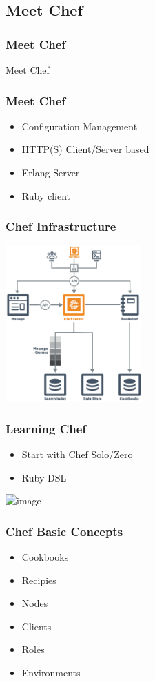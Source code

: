 \subsection{Meet Chef}

\frame
{
  \frametitle{Meet Chef}

  \begin{center}
    \Huge Meet Chef
  \end{center}
}

\frame
{
  \frametitle{Meet Chef}

  \begin{itemize}
  \item<1-> Configuration Management
  \item<2-> HTTP(S) Client/Server based
  \item<3-> Erlang Server
  \item<4-> Ruby client
  \end{itemize}
}

\frame
{
  \frametitle{Chef Infrastructure}
  \begin{center}%
    \includegraphics[height=6cm]{images/server_components.pdf}
  \end{center}%
}

\frame
{
  \frametitle{Learning Chef}

  \begin{itemize}
  \item<1-> Start with Chef Solo/Zero
  \item<2-> Ruby DSL
  \end{itemize}
  \includegraphics<3->[scale=0.5]{images/recipe.png}
}

\frame
{
  \frametitle{Chef Basic Concepts}

  \begin{itemize}
  \item<1-> Cookbooks
  \item<2-> Recipies
  \item<3-> Nodes
  \item<4-> Clients
  \item<5-> Roles
  \item<6-> Environments
  \end{itemize}
}

